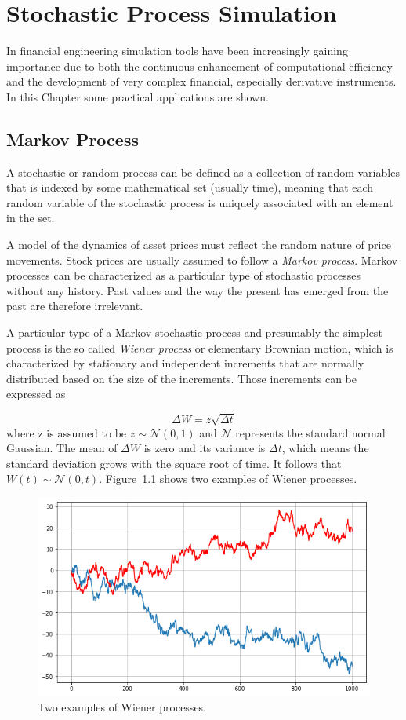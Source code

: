 \chapter{Stochastic Process Simulation}

In financial engineering simulation tools have been increasingly gaining 
importance due to both the continuous enhancement of computational efficiency 
and the development of very complex financial, especially derivative
instruments. In this Chapter some practical applications are shown.

\section{Markov Process}

A stochastic or random process can be defined as a collection of 
random variables that is indexed by some mathematical set (usually time), 
meaning that each random variable of the stochastic process is uniquely 
associated with an element in the set.

A model of the dynamics of asset prices must reflect the random nature
of price movements. Stock prices are usually assumed to follow a 
\emph{Markov process}. Markov processes can be characterized as a
particular type of stochastic processes without any history. Past values
and the way the present has emerged from the past are therefore
irrelevant. 

A particular type of a Markov stochastic
process and presumably the simplest process is the so called \emph{Wiener
process} or elementary Brownian motion, which is characterized by stationary and 
independent increments that are normally distributed based on the size of the increments.
Those increments can be expressed as

\begin{equation}
\Delta W = z\sqrt{\Delta t}
\end{equation}
where z is  assumed to be $z ∼ \mathcal{N}(0, 1)$ and $\mathcal{N}$ represents the standard normal Gaussian. 
The mean of $\Delta W$ is zero and its variance is 
$\Delta t$, which means the standard deviation grows with the square root of time.
It follows that $W(t) ∼ \mathcal{N}(0, t)$. Figure~\ref{fig:wiener_process} shows two examples
of Wiener processes.

\begin{figure}[htb]
	\centering
	\includegraphics[width=0.7\linewidth]{figures/wiener_process.png}
	\caption{Two examples of Wiener processes.}
	\label{fig:wiener_process}
\end{figure}

